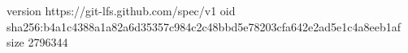 version https://git-lfs.github.com/spec/v1
oid sha256:b4a1c4388a1a82a6d35357c984c2c48bbd5e78203cfa642e2ad5e1c4a8eeb1af
size 2796344
